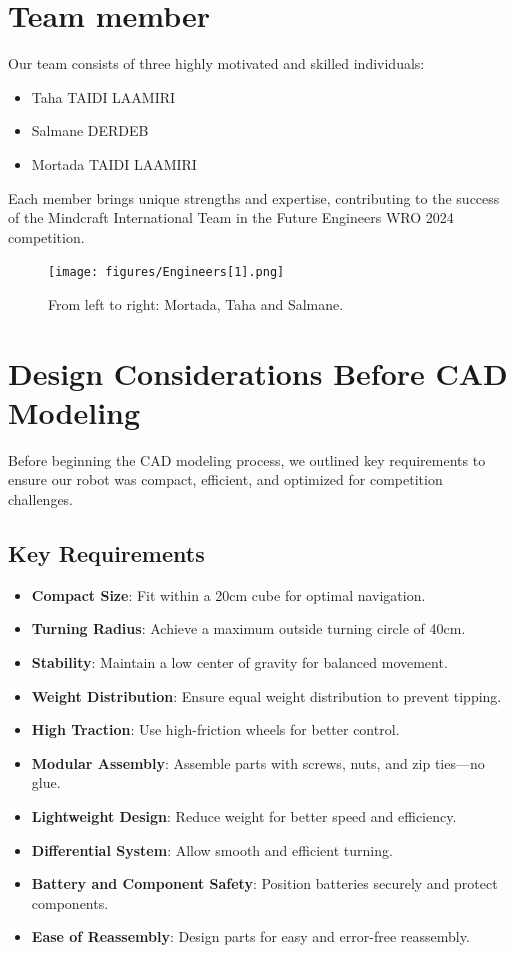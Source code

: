 \documentclass[12pt,a4paper]{article}
\begin{document}
\newpage

\section{Team member}
Our team consists of three highly motivated and skilled individuals:
\begin{itemize}
    \item Taha TAIDI LAAMIRI
    \item Salmane DERDEB
    \item Mortada TAIDI LAAMIRI
\end{itemize}
Each member brings unique strengths and expertise, contributing to the success of the Mindcraft International Team in the Future Engineers WRO 2024 competition.

\begin{figure}[H]
    \centering
    \texttt{[image: figures/Engineers[1].png]}
    \caption{From left to right: Mortada, Taha and Salmane.}

    
\end{figure}

\newpage

\section{Design Considerations Before CAD Modeling}
Before beginning the CAD modeling process, we outlined key requirements to ensure our robot was compact, efficient, and optimized for competition challenges.

\subsection{Key Requirements}
\begin{itemize}
    \item \textbf{Compact Size}: Fit within a 20cm cube for optimal navigation.
    \item \textbf{Turning Radius}: Achieve a maximum outside turning circle of 40cm.
    \item \textbf{Stability}: Maintain a low center of gravity for balanced movement.
    \item \textbf{Weight Distribution}: Ensure equal weight distribution to prevent tipping.
    \item \textbf{High Traction}: Use high-friction wheels for better control.
    \item \textbf{Modular Assembly}: Assemble parts with screws, nuts, and zip ties—no glue.
    \item \textbf{Lightweight Design}: Reduce weight for better speed and efficiency.
    \item \textbf{Differential System}: Allow smooth and efficient turning.
    \item \textbf{Battery and Component Safety}: Position batteries securely and protect components.
    \item \textbf{Ease of Reassembly}: Design parts for easy and error-free reassembly.
\end{itemize}
\end{document}
